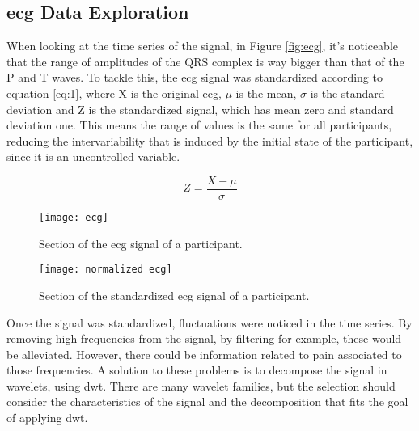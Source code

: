 

\subsection{\ac{ecg} Data Exploration}
When looking at the time series of the signal, in Figure \ref{fig:ecg}, it's noticeable that the range of amplitudes of the QRS complex is way bigger than that of the P and T waves.
To tackle this, the \ac{ecg} signal was standardized according to equation \ref{eq:1}, where X is the original \ac{ecg}, $\mu$ is the mean, $\sigma$ is the standard deviation and Z is the standardized signal, which has mean zero and standard deviation one. 
This means the range of values is the same for all participants, reducing the intervariability that is induced by the initial state of the participant, since it is an uncontrolled variable.

\begin{equation} \label{eq:1}
Z = \frac{X-\mu}{\sigma}
\end{equation}


\begin{figure}[htbp]
    \centering
    \begin{minipage}{0.45\textwidth}
        \centering
        \texttt{[image: ecg]}
        \caption{Section of the \ac{ecg} signal of a participant.}
        \label{fig:ecg}
    \end{minipage}
    \hfill
    \begin{minipage}{0.45\textwidth}
        \centering
        \texttt{[image: normalized ecg]}
        \caption{Section of the standardized \ac{ecg} signal of a participant.}
        \label{fig:normalized_ecg}
    \end{minipage}
\end{figure}

Once the signal was standardized, fluctuations were noticed in the time series.
By removing high frequencies from the signal, by filtering for example, these would be alleviated.
However, there could be information related to pain associated to those frequencies.
A solution to these problems is to decompose the signal in wavelets, using \ac{dwt}. There are many wavelet families, but the selection should consider the characteristics of the signal and the decomposition that fits the goal of applying \ac{dwt}.

